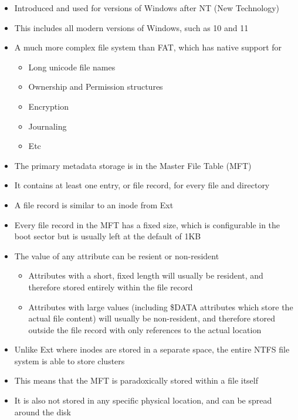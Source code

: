\begin{itemize}
  \item Introduced and used for versions of Windows after NT (New Technology)
  \item This includes all modern versions of Windows, such as 10 and 11
  \item A much more complex file system than FAT, which has native support for
  \begin{itemize}
    \item Long unicode file names
    \item Ownership and Permission structures
    \item Encryption
    \item Journaling
    \item Etc
  \end{itemize}
  \item The primary metadata storage is in the Master File Table (MFT)
  \item It contains at least one entry, or file record, for every file and directory
  \item A file record is similar to an inode from Ext
  \item Every file record in the MFT has a fixed size, which is configurable in the boot sector but is usually left at the default of 1KB
  \item The value of any attribute can be resient or non-resident
  \begin{itemize}
    \item Attributes with a short, fixed length will usually be resident, and therefore stored entirely within the file record
    \item Attributes with large values (including \$DATA attributes which store the actual file content) will usually be non-resident, and therefore stored outside the file record with only references to the actual location
  \end{itemize}
  \item Unlike Ext where inodes are stored in a separate space, the entire NTFS file system is able to store clusters
  \item This means that the MFT is paradoxically stored within a file itself
  \item It is also not stored in any specific physical location, and can be spread around the disk
\end{itemize}